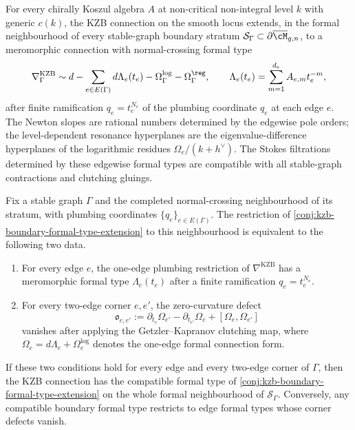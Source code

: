 \begin{conjecture}
\label{conj:kzb-boundary-formal-type-extension}
\ClaimStatusConjectured
For every chirally Koszul algebra \(A\) at non-critical
non-integral level \(k\) with generic \(c(k)\), the KZB connection
on the smooth locus extends, in the formal neighbourhood of every
stable-graph boundary stratum
\(\mathcal S_{\Gamma}\subset\partial\overline{\cM}_{g,n}\), to a
meromorphic connection with normal-crossing formal type
\[
 \nabla_{\Gamma}^{\mathrm{KZB}}
 \sim
 d
 -
 \sum_{e\in E(\Gamma)} d\Lambda_{e}(t_{e})
 -
 \Omega_{\Gamma}^{\log}
 -
 \Omega_{\Gamma}^{\reg},
 \qquad
 \Lambda_{e}(t_{e})
 =
 \sum_{m=1}^{d_e} A_{e,m}t_{e}^{-m},
\]
after finite ramification \(q_e=t_e^{N_e}\) of the plumbing
coordinate \(q_e\) at each edge \(e\). The Newton slopes are
rational numbers determined by the edgewise pole orders; the
level-dependent resonance hyperplanes are the eigenvalue-difference
hyperplanes of the logarithmic residues
\(\Omega_e/(k+h^\vee)\). The Stokes filtrations determined by
these edgewise formal types are compatible with all stable-graph
contractions and clutching gluings.
\end{conjecture}

\begin{proposition}
\label{prop:kzb-boundary-formal-type-edge-corner-reduction}
\ClaimStatusConditional
Fix a stable graph \(\Gamma\) and the completed normal-crossing
neighbourhood of its stratum, with plumbing coordinates
\(\{q_e\}_{e\in E(\Gamma)}\). The restriction of
\autoref{conj:kzb-boundary-formal-type-extension} to this
neighbourhood is equivalent to the following two data.
\begin{enumerate}
\item For every edge \(e\), the one-edge plumbing restriction of
 \(\nabla^{\mathrm{KZB}}\) has a meromorphic formal type
 \(\Lambda_e(t_e)\) after a finite ramification \(q_e=t_e^{N_e}\).
\item For every two-edge corner \(e,e'\), the zero-curvature
 defect
 \[
 \mathfrak{o}_{e,e'}
 :=
 \partial_{t_e}\Omega_{e'}
 -
 \partial_{t_{e'}}\Omega_e
 +
 [\Omega_e,\Omega_{e'}]
 \]
 vanishes after applying the Getzler--Kapranov clutching map,
 where \(\Omega_e=d\Lambda_e+\Omega_e^{\log}\) denotes the
 one-edge formal connection form.
\end{enumerate}
If these two conditions hold for every edge and every two-edge
corner of \(\Gamma\), then the KZB connection has the compatible
formal type of
\autoref{conj:kzb-boundary-formal-type-extension} on the whole
formal neighbourhood of \(\mathcal S_\Gamma\). Conversely, any
compatible boundary formal type restricts to edge formal types whose
corner defects vanish.
\end{proposition}

